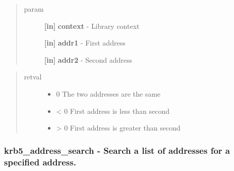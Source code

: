 \documentclass[letterpaper,10pt,english]{sphinxmanual}
\begin{document}
\begin{quote}\begin{description}
\item[{param}] \leavevmode
\textbf{{[}in{]}} \textbf{context} - Library context

\textbf{{[}in{]}} \textbf{addr1} - First address

\textbf{{[}in{]}} \textbf{addr2} - Second address

\end{description}\end{quote}
\begin{quote}\begin{description}
\item[{retval}] \leavevmode\begin{itemize}
\item {} 
0   The two addresses are the same

\item {} 
\textless{}   0 First address is less than second

\item {} 
\textgreater{}   0 First address is greater than second

\end{itemize}

\end{description}\end{quote}


\subsubsection{krb5\_address\_search -  Search a list of addresses for a specified address.}
\label{appdev/refs/api/krb5_address_search:krb5-address-search-search-a-list-of-addresses-for-a-specified-address}\label{appdev/refs/api/krb5_address_search::doc}

\begin{fulllineitems}
\label{appdev/refs/api/krb5_address_search:c.krb5_address_search}
\end{fulllineitems}
\end{document}

